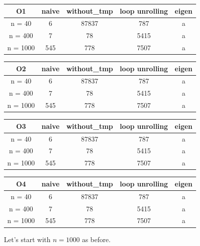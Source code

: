 \documentclass[11pt,a4paper,oneside,titlepage,openright]{book}
\begin{document}
\begin{center}
 \begin{tabular}{|c c c c c |} 
 \hline
 O1 & naive & without\_tmp & loop unrolling & eigen \\ [0.5ex] 
 \hline
 n = 40 & 6 & 87837 & 787  & a\\ 
 \hline
 n = 400 & 7 & 78 & 5415 & a\\
 \hline
 n = 1000 & 545 & 778 & 7507 & a\\
 \hline
\end{tabular}
\end{center}

\begin{center}
 \begin{tabular}{|c c c c c |} 
 \hline
 O2 & naive & without\_tmp & loop unrolling & eigen \\ [0.5ex] 
 \hline
 n = 40 & 6 & 87837 & 787  & a\\ 
 \hline
 n = 400 & 7 & 78 & 5415 & a\\
 \hline
 n = 1000 & 545 & 778 & 7507 & a\\
 \hline
\end{tabular}
\end{center}

\begin{center}
 \begin{tabular}{|c c c c c |} 
 \hline
 O3 & naive & without\_tmp & loop unrolling & eigen \\ [0.5ex] 
 \hline
 n = 40 & 6 & 87837 & 787  & a\\ 
 \hline
 n = 400 & 7 & 78 & 5415 & a\\
 \hline
 n = 1000 & 545 & 778 & 7507 & a\\
 \hline
\end{tabular}
\end{center}

\begin{center}
 \begin{tabular}{|c c c c c |} 
 \hline
 O4 & naive & without\_tmp & loop unrolling & eigen \\ [0.5ex] 
 \hline
 n = 40 & 6 & 87837 & 787  & a\\ 
 \hline
 n = 400 & 7 & 78 & 5415 & a\\
 \hline
 n = 1000 & 545 & 778 & 7507 & a\\
 \hline
\end{tabular}
\end{center}


Let's start with $n = 1000$ as before.
\end{document}
